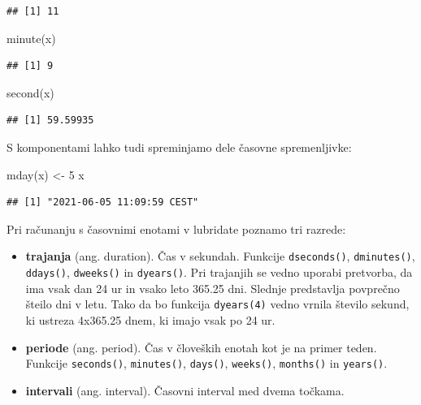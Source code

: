 \documentclass[
]{book}
\newenvironment{Shaded}{\begin{snugshade}}{\end{snugshade}}
\newcommand{\DecValTok}[1]{\textcolor[rgb]{0.00,0.00,0.81}{#1}}
\newcommand{\FunctionTok}[1]{\textcolor[rgb]{0.00,0.00,0.00}{#1}}
\newcommand{\NormalTok}[1]{#1}
\newcommand{\OtherTok}[1]{\textcolor[rgb]{0.56,0.35,0.01}{#1}}
\providecommand{\tightlist}{%
  \setlength{\itemsep}{0pt}\setlength{\parskip}{0pt}}
\begin{document}
\begin{verbatim}
## [1] 11
\end{verbatim}

\begin{Shaded}
\begin{Highlighting}[]
\FunctionTok{minute}\NormalTok{(x)}
\end{Highlighting}
\end{Shaded}

\begin{verbatim}
## [1] 9
\end{verbatim}

\begin{Shaded}
\begin{Highlighting}[]
\FunctionTok{second}\NormalTok{(x)}
\end{Highlighting}
\end{Shaded}

\begin{verbatim}
## [1] 59.59935
\end{verbatim}

S komponentami lahko tudi spreminjamo dele časovne spremenljivke:

\begin{Shaded}
\begin{Highlighting}[]
\FunctionTok{mday}\NormalTok{(x) }\OtherTok{\textless{}{-}} \DecValTok{5}
\NormalTok{x}
\end{Highlighting}
\end{Shaded}

\begin{verbatim}
## [1] "2021-06-05 11:09:59 CEST"
\end{verbatim}

Pri računanju s časovnimi enotami v lubridate poznamo tri razrede:

\begin{itemize}
\tightlist
\item
  \textbf{trajanja} (ang. duration). Čas v sekundah. Funkcije \texttt{dseconds()}, \texttt{dminutes()}, \texttt{ddays()}, \texttt{dweeks()} in \texttt{dyears()}. Pri trajanjih se vedno uporabi pretvorba, da ima vsak dan 24 ur in vsako leto 365.25 dni. Slednje predstavlja povprečno šteilo dni v letu. Tako da bo funkcija \texttt{dyears(4)} vedno vrnila število sekund, ki ustreza 4x365.25 dnem, ki imajo vsak po 24 ur.
\item
  \textbf{periode} (ang. period). Čas v človeških enotah kot je na primer teden. Funkcije \texttt{seconds()}, \texttt{minutes()}, \texttt{days()}, \texttt{weeks()}, \texttt{months()} in \texttt{years()}.
\item
  \textbf{intervali} (ang. interval). Časovni interval med dvema točkama.
\end{itemize}
\end{document}
